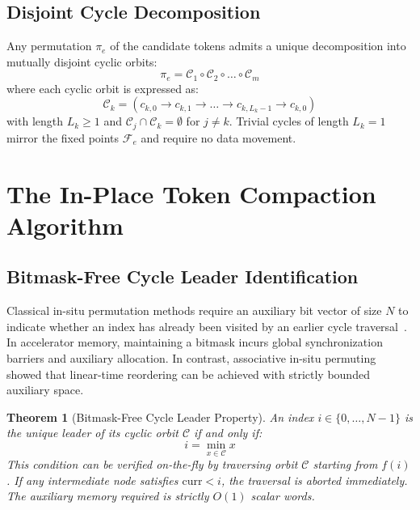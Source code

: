 \documentclass[10pt,twocolumn]{article}
\newtheorem{theorem}{Theorem}
\begin{document}
\subsection{Disjoint Cycle Decomposition}
Any permutation $\pi_e$ of the candidate tokens admits a unique decomposition into mutually disjoint cyclic orbits:
\begin{equation}
    \pi_e = \mathcal{C}_1 \circ \mathcal{C}_2 \circ \dots \circ \mathcal{C}_m
\end{equation}
where each cyclic orbit is expressed as:
\begin{equation}
    \mathcal{C}_k = (c_{k,0} \to c_{k,1} \to \dots \to c_{k,L_k-1} \to c_{k,0})
\end{equation}
with length $L_k \ge 1$ and $\mathcal{C}_j \cap \mathcal{C}_k = \emptyset$ for $j \ne k$. Trivial cycles of length $L_k = 1$ mirror the fixed points $\mathcal{F}_e$ and require no data movement.

\section{The In-Place Token Compaction Algorithm}
\label{sec:algorithm}

\subsection{Bitmask-Free Cycle Leader Identification}
Classical in-situ permutation methods require an auxiliary bit vector of size $N$ to indicate whether an index has already been visited by an earlier cycle traversal~\cite{knuth1998art}. In accelerator memory, maintaining a bitmask incurs global synchronization barriers and auxiliary allocation. In contrast, associative in-situ permuting~\cite{cetin2013insitu, cetin2013inplace, cetin2012improved} showed that linear-time reordering can be achieved with strictly bounded auxiliary space.

\begin{theorem}[Bitmask-Free Cycle Leader Property]
An index $i \in \{0, \dots, N-1\}$ is the unique leader of its cyclic orbit $\mathcal{C}$ if and only if:
\begin{equation}
    i = \min_{x \in \mathcal{C}} x
\end{equation}
This condition can be verified on-the-fly by traversing orbit $\mathcal{C}$ starting from $f(i)$. If any intermediate node satisfies $\text{curr} < i$, the traversal is aborted immediately. The auxiliary memory required is strictly $O(1)$ scalar words.
\end{theorem}
\end{document}
